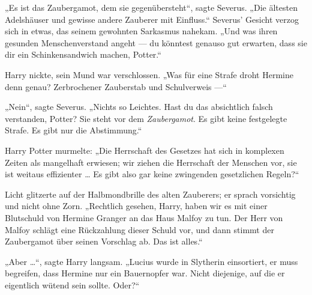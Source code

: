 „Es ist das Zaubergamot, dem sie gegenübersteht“, sagte Severus.
„Die ältesten Adelshäuser und gewisse andere Zauberer mit Einfluss.“ Severus’ Gesicht verzog sich in etwas, das seinem gewohnten Sarkasmus nahekam.
„Und was ihren gesunden Menschenverstand angeht — du könntest genauso gut erwarten, dass sie dir ein Schinkensandwich machen, Potter.“

Harry nickte, sein Mund war verschlossen.
„Was für eine Strafe droht Hermine denn genau? Zerbrochener Zauberstab und Schulverweis —“

„Nein“, sagte Severus.
„Nichts so Leichtes. Hast du das absichtlich falsch verstanden, Potter? Sie steht vor dem \emph{Zaubergamot}. Es gibt keine festgelegte Strafe. Es gibt nur die Abstimmung.“

Harry Potter murmelte:
„Die Herrschaft des Gesetzes hat sich in komplexen Zeiten als mangelhaft erwiesen; wir ziehen die Herrschaft der Menschen vor, sie ist weitaus effizienter … Es gibt also gar keine zwingenden gesetzlichen Regeln?“

Licht glitzerte auf der Halbmondbrille des alten Zauberers; er sprach vorsichtig und nicht ohne Zorn.
„Rechtlich gesehen, Harry, haben wir es mit einer Blutschuld von Hermine Granger an das Haus Malfoy zu tun. Der Herr von Malfoy schlägt eine Rückzahlung dieser Schuld vor, und dann stimmt der Zaubergamot über seinen Vorschlag ab. Das ist alles.“

„Aber …“, sagte Harry langsam.
„Lucius wurde in Slytherin einsortiert, er muss begreifen, dass Hermine nur ein Bauernopfer war. Nicht diejenige, auf die er eigentlich wütend sein sollte. Oder?“

